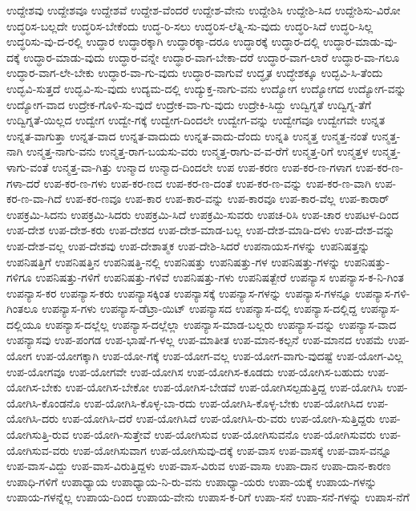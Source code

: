 {ಉದ್ದೇಶವು
ಉದ್ದೇಶವೂ
ಉದ್ದೇಶವೆ
ಉದ್ದೇಶ-ವೆಂದರೆ
ಉದ್ದೇಶ-ವೇನು
ಉದ್ದೇಶಿಸಿ
ಉದ್ದೇಶಿ-ಸಿದ
ಉದ್ದೇಶಿಸು-ವಿರೋ
ಉದ್ಧರಿಸ-ಬಲ್ಲದೇ
ಉದ್ಧರಿಸ-ಬೇಕೆಂದು
ಉದ್ಧ-ರಿ-ಸಲು
ಉದ್ಧರಿಸ-ಲೆತ್ನಿ-ಸು-ವುದು
ಉದ್ಧರಿ-ಸಿದೆ
ಉದ್ಧರಿ-ಸಿಲ್ಲ
ಉದ್ಧರಿಸು-ವು-ದ-ರಲ್ಲಿ
ಉದ್ಧಾರ
ಉದ್ಧಾರಕ್ಕಾಗಿ
ಉದ್ಧಾರಕ್ಕಾ-ದರೂ
ಉದ್ಧಾರಕ್ಕೆ
ಉದ್ಧಾರ-ದಲ್ಲಿ
ಉದ್ಧಾರ-ಮಾಡು-ವು-ದಕ್ಕೆ
ಉದ್ಧಾರ-ಮಾಡು-ವುದು
ಉದ್ಧಾರ-ವನ್ನೇ
ಉದ್ಧಾರ-ವಾಗ-ಬೇಕಾ-ದರೆ
ಉದ್ಧಾರ-ವಾಗ-ಲಾರೆ
ಉದ್ಧಾರ-ವಾ-ಗಲೂ
ಉದ್ಧಾರ-ವಾಗ-ಲೇ-ಬೇಕು
ಉದ್ಧಾರ-ವಾ-ಗು-ವುದು
ಉದ್ಧಾರ-ವಾಗುವೆ
ಉದ್ಧೃತ
ಉದ್ಧೇಶಕ್ಕೂ
ಉದ್ಭವಿ-ಸಿ-ತೆಂದು
ಉದ್ಭವಿ-ಸುತ್ತದೆ
ಉದ್ಭವಿ-ಸು-ವುದು
ಉದ್ಯಮ-ದಲ್ಲಿ
ಉದ್ಯುಕ್ತ-ನಾಗು-ವನು
ಉದ್ಯೋಗ
ಉದ್ಯೋಗದ
ಉದ್ಯೋಗ-ವನ್ನು
ಉದ್ಯೋಗ-ವಾದ
ಉದ್ರೇಕ-ಗೊಳಿ-ಸು-ವುದೆ
ಉದ್ರೇಕ-ವಾ-ಗು-ವುದು
ಉದ್ರೇಕಿ-ಸಿದ್ದು
ಉದ್ವಿಗ್ನತೆ
ಉದ್ವಿಗ್ನ-ತೆಗೆ
ಉದ್ವಿಗ್ನತೆ-ಯಿಲ್ಲದ
ಉದ್ವೇಗ
ಉದ್ವೇ-ಗಕ್ಕೆ
ಉದ್ವೇಗ-ದಿಂದಲೇ
ಉದ್ವೇಗ-ವನ್ನು
ಉದ್ವೇಗವೂ
ಉದ್ವೇಗವೇ
ಉನ್ನತ
ಉನ್ನತ-ವಾಗುತ್ತಾ
ಉನ್ನತ-ವಾದ
ಉನ್ನತ-ವಾದುದು
ಉನ್ನತ-ವಾದು-ದೆಂದು
ಉನ್ನತಿ
ಉನ್ಮತ್ತ
ಉನ್ಮತ್ತ-ನಂತೆ
ಉನ್ಮತ್ತ-ನಾಗಿ
ಉನ್ಮತ್ತ-ನಾಗು-ವನು
ಉನ್ಮತ್ತ-ರಾಗ-ಬಯಸು-ವರು
ಉನ್ಮತ್ತ-ರಾಗು-ವ-ವ-ರೆಗೆ
ಉನ್ಮತ್ತ-ರಿಗೆ
ಉನ್ಮತ್ತಳ
ಉನ್ಮತ್ತ-ಳಾಗು-ವಂತೆ
ಉನ್ಮತ್ತ-ವಾ-ಗಿತ್ತು
ಉನ್ಮಾದ
ಉನ್ಮಾದ-ದಿಂದಲೇ
ಉಪ
ಉಪ-ಕರಣ
ಉಪ-ಕರ-ಣ-ಗಳಾಗ
ಉಪ-ಕರ-ಣ-ಗಳಾ-ದರೆ
ಉಪ-ಕರ-ಣ-ಗಳು
ಉಪ-ಕರ-ಣದ
ಉಪ-ಕರ-ಣ-ದಂತೆ
ಉಪ-ಕರ-ಣ-ವನ್ನು
ಉಪ-ಕರ-ಣ-ವಾಗಿ
ಉಪ-ಕರ-ಣ-ವಾ-ಗಿದೆ
ಉಪ-ಕರ-ಣವೂ
ಉಪ-ಕಾರ
ಉಪ-ಕಾರ-ವನ್ನು
ಉಪ-ಕಾರವೂ
ಉಪ-ಕಾರ-ವೆಲ್ಲ
ಉಪ-ಕಾರಾರ್
ಉಪಕ್ರಮಿ-ಸಿದನು
ಉಪಕ್ರಮಿ-ಸಿದರು
ಉಪಕ್ರಮಿ-ಸಿದೆ
ಉಪಕ್ರಮಿ-ಸುವರು
ಉಪಚ-ರಿಸಿ
ಉಪ-ಚಾರ
ಉಪಟಳ-ದಿಂದ
ಉಪ-ದೇಶ
ಉಪ-ದೇಶ-ಕರು
ಉಪ-ದೇಶದ
ಉಪ-ದೇಶ-ಮಾಡ-ಬಲ್ಲ
ಉಪ-ದೇಶ-ಮಾಡಿ-ದಳು
ಉಪ-ದೇಶ-ವನ್ನು
ಉಪ-ದೇಶ-ವಲ್ಲ
ಉಪ-ದೇಶವು
ಉಪ-ದೇಶಾತ್ಮಕ
ಉಪ-ದೇಶಿ-ಸಿದರೆ
ಉಪನಾಯಸ-ಗಳನ್ನು
ಉಪನಿಷತ್ತನ್ನು
ಉಪನಿಷತ್ತಿಗೆ
ಉಪನಿಷತ್ತಿನ
ಉಪನಿಷತ್ತಿ-ನಲ್ಲಿ
ಉಪನಿಷತ್ತು
ಉಪನಿಷತ್ತು-ಗಳ
ಉಪನಿಷತ್ತು-ಗಳನ್ನು
ಉಪನಿಷತ್ತು-ಗಳಿಗೂ
ಉಪನಿಷತ್ತು-ಗಳಿಗೆ
ಉಪನಿಷತ್ತು-ಗಳಿವೆ
ಉಪನಿಷತ್ತು-ಗಳು
ಉಪನಿಷತ್ಬೇರೆ
ಉಪನ್ಯಾಸ
ಉಪನ್ಯಾಸ-ಕ-ನಿ-ಗಿಂತ
ಉಪನ್ಯಾಸ-ಕರ
ಉಪನ್ಯಾಸ-ಕರು
ಉಪನ್ಯಾಸಕ್ಕಿಂತ
ಉಪನ್ಯಾಸಕ್ಕೆ
ಉಪನ್ಯಾಸ-ಗಳನ್ನು
ಉಪನ್ಯಾಸ-ಗಳನ್ನೂ
ಉಪನ್ಯಾಸ-ಗಳಿ-ಗಿಂತಲೂ
ಉಪನ್ಯಾಸ-ಗಳು
ಉಪನ್ಯಾಸ-ಡೆಟ್ರಾ-ಯಿಟ್
ಉಪನ್ಯಾಸದ
ಉಪನ್ಯಾಸ-ದಲ್ಲಿ
ಉಪನ್ಯಾಸ-ದಲ್ಲಿದ್ದ
ಉಪನ್ಯಾಸ-ದಲ್ಲಿಯೂ
ಉಪನ್ಯಾಸ-ದಲ್ಲೆಲ್ಲ
ಉಪನ್ಯಾಸ-ದಲ್ಲೆಲ್ಲಾ
ಉಪನ್ಯಾಸ-ಮಾಡ-ಬಲ್ಲರು
ಉಪನ್ಯಾಸ-ವನ್ನು
ಉಪನ್ಯಾಸ-ವಾದ
ಉಪನ್ಯಾಸವು
ಉಪ-ಪಂಗಡ
ಉಪ-ಭಾಷೆ-ಗ-ಳಲ್ಲ
ಉಪ-ಮಾತೀತ
ಉಪ-ಮಾನ-ಕಲ್ಪನೆ
ಉಪ-ಮಾನದ
ಉಪಮೆ
ಉಪ-ಯೋಗ
ಉಪ-ಯೋಗಕ್ಕಾಗಿ
ಉಪ-ಯೋ-ಗಕ್ಕೆ
ಉಪ-ಯೋಗ-ವಲ್ಲ
ಉಪ-ಯೋಗ-ವಾಗು-ವುದಷ್ಟೆ
ಉಪ-ಯೋಗ-ವಿಲ್ಲ
ಉಪ-ಯೋಗವೂ
ಉಪ-ಯೋಗವೇ
ಉಪ-ಯೋಗಿಸ
ಉಪ-ಯೋಗಿಸ-ಕೂಡದು
ಉಪ-ಯೋಗಿಸ-ಬಹುದು
ಉಪ-ಯೋಗಿಸ-ಬೇಕು
ಉಪ-ಯೋಗಿಸ-ಬೇಕೋ
ಉಪ-ಯೋಗಿಸ-ಬೇಡವೆ
ಉಪ-ಯೋಗಿಸಲ್ಪಡುತ್ತಿದ್ದ
ಉಪ-ಯೋಗಿಸಿ
ಉಪ-ಯೋಗಿಸಿ-ಕೊಂಡನೊ
ಉಪ-ಯೋಗಿಸಿ-ಕೊಳ್ಳ-ಬಾ-ರದು
ಉಪ-ಯೋಗಿಸಿ-ಕೊಳ್ಳ-ಬೇಕು
ಉಪ-ಯೋಗಿಸಿದ
ಉಪ-ಯೋಗಿಸಿ-ದರು
ಉಪ-ಯೋಗಿಸಿ-ದರೆ
ಉಪ-ಯೋಗಿಸಿದೆ
ಉಪ-ಯೋಗಿಸಿ-ರು-ವರು
ಉಪ-ಯೋಗಿ-ಸುತ್ತಿದ್ದರು
ಉಪ-ಯೋಗಿಸುತ್ತಿ-ರುವ
ಉಪ-ಯೋಗಿ-ಸುತ್ತೇವೆ
ಉಪ-ಯೋಗಿಸುವ
ಉಪ-ಯೋಗಿಸುವನೊ
ಉಪ-ಯೋಗಿಸುವರು
ಉಪ-ಯೋಗಿಸುವ-ವರು
ಉಪ-ಯೋಗಿಸುವಾಗ
ಉಪ-ಯೋಗಿಸುವು-ದಕ್ಕೆ
ಉಪ-ವಾಸ
ಉಪ-ವಾಸಕ್ಕೆ
ಉಪ-ವಾಸ-ವನ್ನೂ
ಉಪ-ವಾಸ-ವಿದ್ದು
ಉಪ-ವಾಸ-ವಿರುತ್ತಿದ್ದಳು
ಉಪ-ವಾಸ-ವಿರುವ
ಉಪ-ವಾಸಾ
ಉಪಾ-ದಾನ
ಉಪಾ-ದಾನ-ಕಾರಣ
ಉಪಾಧಿ-ಗಳಿಗೆ
ಉಪಾಧ್ಯಾಯ
ಉಪಾಧ್ಯಾಯ-ನಿ-ರು-ವನು
ಉಪಾಧ್ಯಾ-ಯರು
ಉಪಾ-ಯಕ್ಕೆ
ಉಪಾಯ-ಗಳನ್ನು
ಉಪಾಯ-ಗಳನ್ನೆಲ್ಲ
ಉಪಾಯ-ದಿಂದ
ಉಪಾಯ-ವೇನು
ಉಪಾಸ-ಕ-ರಿಗೆ
ಉಪಾ-ಸನೆ
ಉಪಾ-ಸನೆ-ಗಳನ್ನು
ಉಪಾಸ-ನೆಗೆ
}
